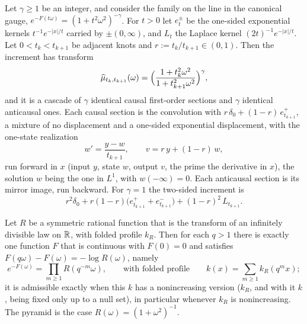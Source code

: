 \begin{theorem}
\label{thm:cited-A19}

Let $\gamma \ge 1$ be an integer, and consider the \Matern{} family on the line in the canonical
gauge, $e^{-F(t\omega)} = (1 + t^2\omega^2)^{-\gamma}$. For $t > 0$ let $e^\pm_t$ be
the one-sided exponential kernels $t^{-1}e^{-|x|/t}$ carried by $\pm(0,\infty)$, and
$L_t$ the Laplace kernel $(2t)^{-1}e^{-|x|/t}$. Let $0 < t_k < t_{k+1}$ be adjacent knots
and $r := t_k/t_{k+1} \in (0,1)$. Then the increment has transform
\[
  \widehat\mu_{t_k, t_{k+1}}(\omega) = \Bigl(\frac{1 + t_k^2\omega^2}{1 + t_{k+1}^2\omega^2}\Bigr)^{\gamma},
\]
and it is a cascade of $\gamma$ identical causal first-order sections and $\gamma$ identical
anticausal ones. Each causal section is the convolution with
$r\,\delta_0 + (1 - r)\,e^+_{t_{k+1}}$, a mixture of no displacement and a one-sided
exponential displacement, with the one-state realization
\[
  w' = \frac{y - w}{t_{k+1}}, \qquad v = r\,y + (1 - r)\,w,
\]
run forward in $x$ (input $y$, state $w$, output $v$, the prime the derivative in $x$), the
solution $w$ being the one in $L^1$, with $w(-\infty) = 0$. Each anticausal
section is its mirror image, run backward. For $\gamma = 1$ the two-sided increment is
\[
  r^2\delta_0 + r(1 - r)\bigl(e^+_{t_{k+1}} + e^-_{t_{k+1}}\bigr)
  + (1 - r)^2\,L_{t_{k+1}} .
\]
\end{theorem}

\begin{theorem}
\label{thm:cited-A20}

Let $R$ be a symmetric rational function that is the transform of an infinitely divisible law on
$\mathbb{R}$, with folded \Levy{} profile $k_R$. Then for each $q > 1$ there is exactly one function $F$
that is continuous with $F(0) = 0$ and satisfies $F(q\omega) - F(\omega) = -\log R(\omega)$,
namely
\[
  e^{-F(\omega)} = \prod_{m \ge 1}R(q^{-m}\omega), \qquad\text{with folded profile}\qquad
  k(x) = \sum_{m \ge 1}k_R(q^m x);
\]
it is admissible exactly when this $k$ has a nonincreasing version ($k_R$, and with it $k$, being
fixed only up to a null set), in particular whenever $k_R$ is nonincreasing. The
\Matern{} pyramid is the case $R(\omega) = (1 + \omega^2)^{-1}$.
\end{theorem}

